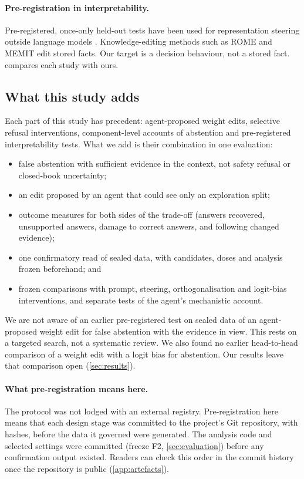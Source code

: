 \paragraph{Pre-registration in interpretability.}
Pre-registered, once-only held-out tests have been used for representation steering outside language models
\citep{readablenotsteerable2026}. Knowledge-editing methods such as ROME and MEMIT \citep{meng2022rome,meng2023memit}
edit stored facts. Our target is a decision behaviour, not a stored fact.  compares each study
with ours.

\subsection{What this study adds}
\label{sec:new}

Each part of this study has precedent: agent-proposed weight edits, selective refusal interventions,
component-level accounts of abstention and pre-registered interpretability tests. What we add is their combination
in one evaluation:
\begin{itemize}[leftmargin=*]
  \item false abstention with sufficient evidence in the context, not safety refusal or closed-book uncertainty;
  \item an edit proposed by an agent that could see only an exploration split;
  \item outcome measures for both sides of the trade-off (answers recovered, unsupported answers, damage to correct
        answers, and following changed evidence);
  \item one confirmatory read of sealed data, with candidates, doses and analysis frozen beforehand; and
  \item frozen comparisons with prompt, steering, orthogonalisation and logit-bias interventions, and separate
        tests of the agent's mechanistic account.
\end{itemize}
We are not aware of an earlier pre-registered test on sealed data of an agent-proposed weight edit for false
abstention with the evidence in view. This rests on a targeted search, not a systematic review. We also found no
earlier head-to-head comparison of a weight edit with a logit bias for abstention. Our results leave that comparison
open (\cref{sec:results}).

\paragraph{What pre-registration means here.}
The protocol was not lodged with an external registry. Pre-registration here means that each design stage was
committed to the project's Git repository, with hashes, before the data it governed were generated. The analysis
code and selected settings were committed (freeze F2, \cref{sec:evaluation}) before any confirmation output existed.
Readers can check this order in the commit history once the repository is public (\cref{app:artefacts}).
